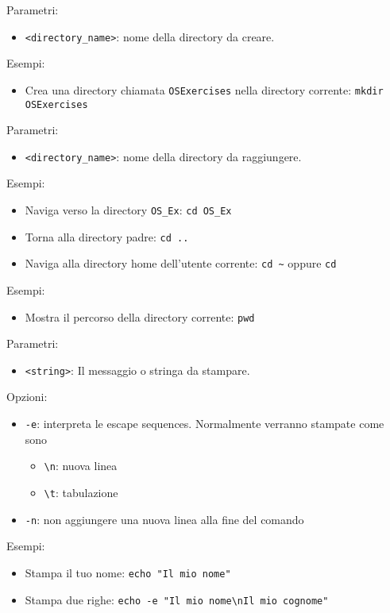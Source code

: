 \vskip3mm
Parametri:
\begin{itemize}
	\item \verb|<directory_name>|: nome della directory da creare.
\end{itemize}
Esempi:
\begin{itemize}
	\item Crea una directory chiamata \verb|OSExercises| nella directory corrente:
	      \vskip3mm
	      \verb|mkdir OSExercises|
\end{itemize}

\vskip3mm
Parametri:
\begin{itemize}
	\item \verb|<directory_name>|: nome della directory da raggiungere.
\end{itemize}
Esempi:
\begin{itemize}
	\item Naviga verso la directory \verb|OS_Ex|:
	      \vskip3mm
	      \verb|cd OS_Ex|
	\item Torna alla directory padre:
	      \vskip3mm
	      \verb|cd ..|
	\item Naviga alla directory home dell'utente corrente:
	      \vskip3mm
	      \verb|cd ~| oppure \verb|cd|
\end{itemize}

Esempi:
\begin{itemize}
	\item Mostra il percorso della directory corrente:
	      \vskip3mm
	      \verb|pwd|
\end{itemize}

\vskip3mm
Parametri:
\begin{itemize}
	\item \verb|<string>|: Il messaggio o stringa da stampare.
\end{itemize}
Opzioni:
\begin{itemize}
	\item \verb|-e|: interpreta le escape sequences. Normalmente verranno stampate come sono
	      \begin{itemize}
		      \item \verb|\n|: nuova linea
		      \item \verb|\t|: tabulazione
	      \end{itemize}
	\item \verb|-n|: non aggiungere una nuova linea alla fine del comando
\end{itemize}
Esempi:
\begin{itemize}
	\item Stampa il tuo nome:
	      \vskip3mm
	      \verb|echo "Il mio nome"|
	\item Stampa due righe:
	      \vskip3mm
	      \verb|echo -e "Il mio nome\nIl mio cognome"|
\end{itemize}

